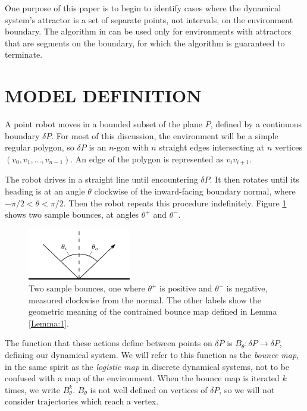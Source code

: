 \documentclass[letterpaper, 10 pt, conference]{ieeeconf}  %
\begin{document}
One purpose of this paper is to begin to identify cases where the dynamical system's attractor is a set of separate points, not intervals, on
the environment boundary. The
algorithm in \cite{bounce} can be used only for environments with attractors that are
segments on the boundary, for which the algorithm is guaranteed to terminate.


\section{MODEL DEFINITION\label{model}}

A point robot moves in a bounded subset of the plane $P$,
defined by a continuous boundary $\delta P$. For most 
of this discussion, the environment will be a simple regular polygon, so $\delta P$ 
is an $n$-gon with $n$ straight edges intersecting at $n$ vertices
$(v_0, v_1, \ldots, v_{n-1})$.  An edge of the polygon is represented as $v_i
v_{i+1}$.

The robot drives in a straight line until encountering $\delta P$. It then rotates
until its heading is at an angle $\theta$ clockwise of the inward-facing boundary
normal, where $-\pi/2 < \theta < \pi/2$. Then the robot repeats this procedure
indefinitely. Figure \ref{bounce_def} shows two sample bounces, at
angles $\theta^+$ and $\theta^-$.

\begin{figure}[thpb]
  \centering
  \includegraphics[width=0.4\textwidth]{figs/bounce_def.pdf}
  \caption{Two sample bounces, one where $\theta^+$ is positive and $\theta^-$
is negative, measured clockwise from the normal. The other labels show the geometric meaning of the
contrained bounce map defined in Lemma \ref{Lemma:1}.}
  \label{bounce_def}
\end{figure}

The function that these actions define between points
on $\delta P$ is $B_{\theta}: \delta P \to \delta P$, defining our dynamical system.
We will refer to this function as the \textit{bounce map}, in the same spirit as
the \textit{logistic map} in discrete dynamical systems, not to be confused with
a map of the environment.
When the bounce map is iterated $k$ times, we write $B^k_{\theta}$.
$B_{\theta}$ is not well defined
on vertices of $\delta P$, so we will not consider trajectories which reach a
vertex.
\end{document}
